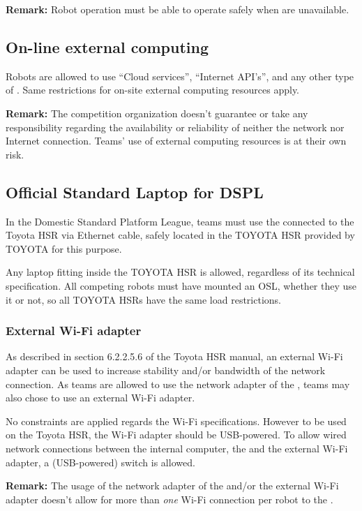 \noindent \textbf{Remark:} Robot operation must be able to operate safely when  are unavailable.



\subsection{On-line external computing}
\label{rule:robot_external_computing_online}
Robots are allowed to use \enquote{Cloud services}, \enquote{Internet API's}, and any other type of .
Same restrictions for on-site external computing resources apply.

\noindent \textbf{Remark:} The competition organization doesn't guarantee or take any responsibility regarding the availability or reliability of neither the network nor Internet connection.
Teams' use of external computing resources is at their own risk.



\subsection{Official Standard Laptop for DSPL}
\label{rule:osl_dspl}

In the Domestic Standard Platform League, teams must use the  connected to the Toyota HSR via Ethernet cable, safely located in the TOYOTA HSR  provided by TOYOTA for this purpose.

Any laptop fitting inside the TOYOTA HSR  is allowed, regardless of its technical specification.
All competing robots must have mounted an OSL, whether they use it or not, so all TOYOTA HSRs have the same load restrictions.

\subsubsection{External Wi-Fi adapter}
As described in section 6.2.2.5.6 of the Toyota HSR manual, an external Wi-Fi adapter can be used to increase stability and/or bandwidth of the network connection. As teams are allowed to use the network adapter of the , teams may also chose to use an external Wi-Fi adapter.

No constraints are applied regards the Wi-Fi specifications. However to be used on the Toyota HSR, the Wi-Fi adapter should be USB-powered. To allow wired network connections between the internal computer, the  and the external Wi-Fi adapter, a (USB-powered) switch is allowed.

\noindent \textbf{Remark:} The usage of the network adapter of the  and/or the external Wi-Fi adapter doesn't allow for more than \emph{one} Wi-Fi connection per robot to the .

